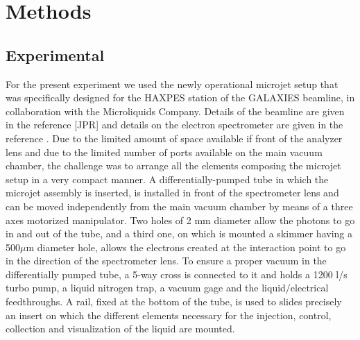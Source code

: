 \section{Methods} \label{sec:methods}
\subsection{Experimental}

{\color{red}For the present experiment we used the newly operational microjet setup that was specifically designed for the HAXPES station of the GALAXIES beamline, in collaboration with the Microliquids Company. Details of the beamline are given in the reference [JPR] and details on the electron spectrometer are given in the reference \citep{ceolin15:022502,ceolin13:188}. Due to the limited amount of space available if front of the analyzer lens and due to the limited number of ports available on the main vacuum chamber, the challenge was to arrange all the elements composing the microjet setup in a very compact manner. A differentially-pumped tube in which the microjet assembly is inserted, is installed in front of the spectrometer lens and can be moved independently from the main vacuum chamber by means of a three axes motorized manipulator. Two holes of 2 mm diameter allow the photons to go in and out of the tube, and a third one, on which is mounted a skimmer having a 500$\mu$m diameter hole, allows the electrons created at the interaction point to go in the direction of the spectrometer lens. To ensure a proper vacuum in the differentially pumped tube, a 5-way cross is connected to it and holds a 1200 l/s turbo pump, a liquid nitrogen trap, a vacuum gage and the liquid/electrical feedthroughs. A rail, fixed at the bottom of the tube, is used to slides precisely an insert on which the different elements necessary for the injection, control, collection and visualization of the liquid are mounted.


}
